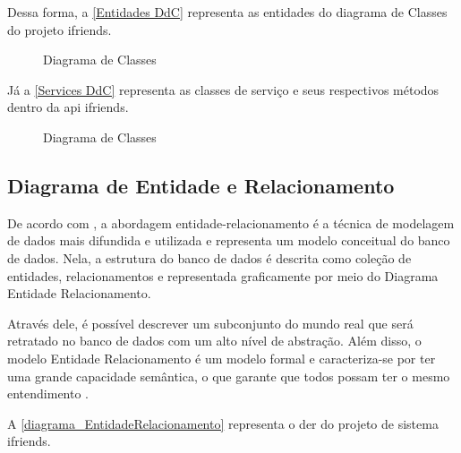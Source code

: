 Dessa forma, a \autoref{Entidades DdC} representa as entidades do diagrama de Classes do projeto \gls{ifriends}.

\begin{figure}[htb]
\centering
\caption{Diagrama de Classes}
\label{Entidades DdC}

\end{figure}
\FloatBarrier

Já a \autoref{Services DdC} representa as classes de serviço e seus respectivos métodos dentro da \gls{api} \gls{ifriends}.

\begin{figure}[htb]
\centering
\caption{Diagrama de Classes}
\label{Services DdC}

\end{figure}
\FloatBarrier

\subsection{Diagrama de Entidade e Relacionamento}
De acordo com , a abordagem entidade-relacionamento é a técnica de modelagem de dados mais difundida e utilizada e representa um modelo conceitual do banco de dados. Nela, a estrutura do banco de dados é descrita como coleção de entidades, relacionamentos e representada graficamente por meio do Diagrama Entidade Relacionamento.

Através dele, é possível descrever um subconjunto do mundo real que será retratado no banco de dados com um alto nível de abstração. Além disso, o modelo Entidade Relacionamento é um modelo formal e caracteriza-se por ter uma grande capacidade semântica, o que garante que todos possam ter o mesmo entendimento \cite{leal2015linguagem}.

A \autoref{diagrama_EntidadeRelacionamento} representa o \ac{der} do projeto de sistema \gls{ifriends}.

